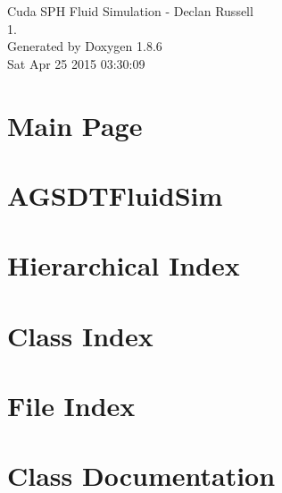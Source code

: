 \documentclass[twoside]{book}
\newcommand{\clearemptydoublepage}{%
  \newpage{\pagestyle{empty}\cleardoublepage}%
}
\begin{document}
\hypersetup{pageanchor=false}
\begin{titlepage}
\vspace*{7cm}
\begin{center}%
{\Large Cuda S\-P\-H Fluid Simulation -\/ Declan Russell \\[1ex]\large 1. }\\
\vspace*{1cm}
{\large Generated by Doxygen 1.8.6}\\
\vspace*{0.5cm}
{\small Sat Apr 25 2015 03:30:09}\\
\end{center}
\end{titlepage}
\clearemptydoublepage
\tableofcontents
\clearemptydoublepage
{}
\hypersetup{pageanchor=true}

\chapter{Main Page}
\label{index}\hypertarget{index}{}
\chapter{A\-G\-S\-D\-T\-Fluid\-Sim}
\label{md__r_e_a_d_m_e}
\hypertarget{md__r_e_a_d_m_e}{}

\chapter{Hierarchical Index}

\chapter{Class Index}

\chapter{File Index}

\chapter{Class Documentation}




















\end{document}
